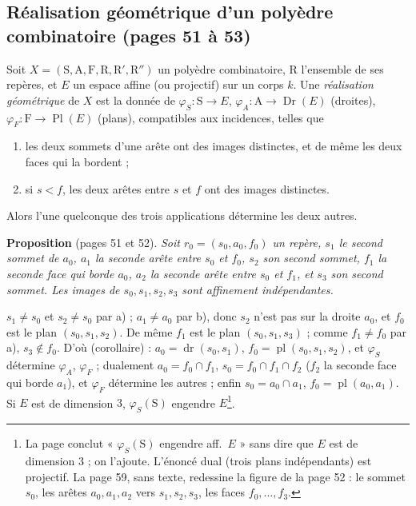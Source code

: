 \documentclass[11pt,a4paper]{article}
\begin{document}
\subsection*{Réalisation géométrique d'un polyèdre combinatoire (pages 51 à 53)}

Soit $X = (\mathrm{S}, \mathrm{A}, \mathrm{F}, \mathrm{R}, \mathrm{R}',
\mathrm{R}'')$ un polyèdre combinatoire, $\mathrm{R}$ l'ensemble de ses repères,
et $E$ un espace affine (ou projectif) sur un corps $k$. Une
\emph{réalisation géométrique} de $X$ est la donnée de $\varphi_S : \mathrm{S} \to
E$, $\varphi_A : \mathrm{A} \to \operatorname{Dr}(E)$ (droites), $\varphi_F :
\mathrm{F} \to \operatorname{Pl}(E)$ (plans), compatibles aux incidences, telles
que
\begin{enumerate}
  \item[a)] les deux sommets d'une arête ont des images distinctes, et de même
    les deux faces qui la bordent ;
  \item[b)] si $s < f$, les deux arêtes entre $s$ et $f$ ont des images
    distinctes.
\end{enumerate}
Alors l'une quelconque des trois applications détermine les deux autres.

\textbf{Proposition} (pages 51 et 52). \emph{Soit $r_0 = (s_0, a_0, f_0)$ un
repère, $s_1$ le second sommet de $a_0$, $a_1$ la seconde arête entre $s_0$ et
$f_0$, $s_2$ son second sommet, $f_1$ la seconde face qui borde $a_0$, $a_2$ la
seconde arête entre $s_0$ et $f_1$, et $s_3$ son second sommet. Les images de
$s_0, s_1, s_2, s_3$ sont affinement indépendantes.}

$s_1 \neq s_0$ et $s_2 \neq s_0$ par a) ; $a_1 \neq a_0$ par b), donc $s_2$
n'est pas sur la droite $a_0$, et $f_0$ est le plan $(s_0, s_1, s_2)$. De même
$f_1$ est le plan $(s_0, s_1, s_3)$ ; comme $f_1 \neq f_0$ par a), $s_3 \notin
f_0$. D'où (corollaire) : $a_0 = \operatorname{dr}(s_0, s_1)$, $f_0 =
\operatorname{pl}(s_0, s_1, s_2)$, et $\varphi_S$ détermine $\varphi_A$,
$\varphi_F$ ; dualement $a_0 = f_0 \cap f_1$, $s_0 = f_0 \cap f_1 \cap f_2$ ($f_2$
la seconde face qui borde $a_1$), et $\varphi_F$ détermine les autres ; enfin
$s_0 = a_0 \cap a_1$, $f_0 = \operatorname{pl}(a_0, a_1)$. Si $E$ est de
dimension $3$, $\varphi_S(\mathrm{S})$ engendre $E$\footnote{La page conclut
« $\varphi_S(\mathrm{S})$ engendre aff.\ $E$ » sans dire que $E$ est de
dimension $3$ ; on l'ajoute. L'énoncé dual (trois plans indépendants) est
projectif. La page 59, sans texte, redessine la figure de la page 52 :
le sommet $s_0$, les arêtes $a_0, a_1, a_2$ vers $s_1, s_2, s_3$, les faces
$f_0, \dots, f_3$.}.
\end{document}
